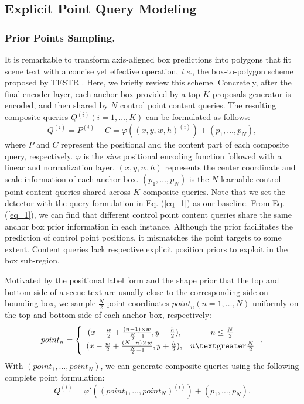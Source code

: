 \documentclass[letterpaper]{article} \usepackage{aaai23}  \usepackage{times}  \usepackage{helvet}  \usepackage{courier}  \usepackage[hyphens]{url}  \usepackage{graphicx} \urlstyle{rm}
\begin{document}
\subsection{Explicit Point Query Modeling}
\subsubsection{Prior Points Sampling.} It is remarkable to transform axis-aligned box predictions into polygons that fit scene text with a concise yet effective operation, \emph{i.e.}, the box-to-polygon scheme proposed by TESTR \cite{zhang2022text}. Here, we briefly review this scheme. Concretely, after the final encoder layer, each anchor box provided by a top-$K$ proposals generator is encoded, and then shared by $N$ control point content queries. The resulting composite queries $Q^{(i)} (i = 1, \ldots , K)$ can be formulated as follows:
\begin{equation}
Q^{(i)} = P^{(i)} + C = \varphi ((x, y, w, h)^{(i)}) + (p_1, \ldots , p_N),\label{eq_1}
\end{equation}
where $P$ and $C$ represent the positional and the content part of each composite query, respectively. $\varphi$ is the \textit{sine} positional encoding function followed with a linear and normalization layer. $(x, y, w, h)$ represents the center coordinate and scale information of each anchor box. $(p_1, \ldots , p_N)$ is the $N$ learnable control point content queries shared across $K$ composite queries. Note that we set the detector with the query formulation in Eq. (\ref{eq_1}) as our baseline. From Eq. (\ref{eq_1}), we can find that different control point content queries share the same anchor box prior information in each instance. Although the prior facilitates the prediction of control point positions, it mismatches the point targets to some extent. Content queries lack respective explicit position priors to exploit in the box sub-region. 

Motivated by the positional label form and the shape prior that the top and bottom side of a scene text are usually close to the corresponding side on bounding box, we sample $\frac{N}{2}$ point coordinates $point_n(n = 1, \ldots , N)$ uniformly on the top and bottom side of each anchor box, respectively:
\begin{equation}
point_n = \left\{
\begin{array}{cc}
(x - \frac{w}{2} + \frac{(n - 1) \times w}{\frac{N}{2} - 1}, y - \frac{h}{2}), & {n \leq \frac{N}{2}} \\
(x - \frac{w}{2} + \frac{(N - n) \times w}{\frac{N}{2} - 1}, y + \frac{h}{2}), & {n \textgreater \frac{N}{2}}
\end{array} \right. .
\end{equation}
\label{eq_2}
With $(point_1, \ldots , point_N)$, we can generate composite queries using the following complete point formulation: 
\begin{equation}
Q^{(i)} = \varphi' ((point_1, \ldots , point_N)^{(i)}) + (p_1, \ldots , p_N).\label{eq_3}
\end{equation}
\end{document}
